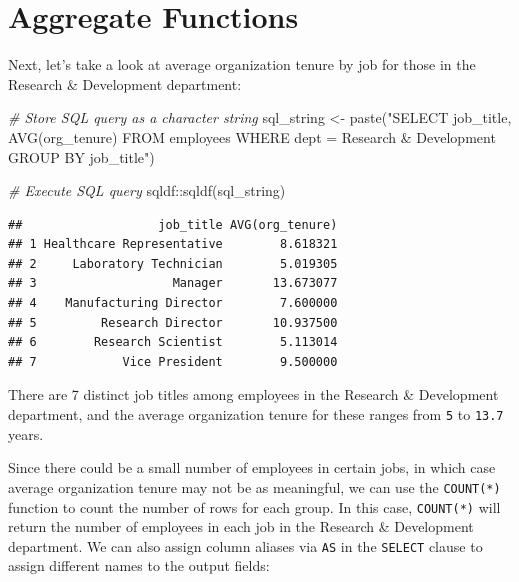 \documentclass[
]{book}
\newenvironment{Shaded}{\begin{snugshade}}{\end{snugshade}}
\newcommand{\CommentTok}[1]{\textcolor[rgb]{0.56,0.35,0.01}{\textit{#1}}}
\newcommand{\FunctionTok}[1]{\textcolor[rgb]{0.00,0.00,0.00}{#1}}
\newcommand{\NormalTok}[1]{#1}
\newcommand{\OtherTok}[1]{\textcolor[rgb]{0.56,0.35,0.01}{#1}}
\newcommand{\SpecialCharTok}[1]{\textcolor[rgb]{0.00,0.00,0.00}{#1}}
\newcommand{\StringTok}[1]{\textcolor[rgb]{0.31,0.60,0.02}{#1}}
\begin{document}
\hypertarget{aggregate-functions}{%
\section{Aggregate Functions}\label{aggregate-functions}}

Next, let's take a look at average organization tenure by job for those in the Research \& Development department:

\begin{Shaded}
\begin{Highlighting}[]
\CommentTok{\# Store SQL query as a character string}
\NormalTok{sql\_string }\OtherTok{\textless{}{-}} \FunctionTok{paste}\NormalTok{(}\StringTok{"SELECT}
\StringTok{                      job\_title,}
\StringTok{                      AVG(org\_tenure)}
\StringTok{                    FROM}
\StringTok{                      employees}
\StringTok{                    WHERE}
\StringTok{                      dept = \textquotesingle{}Research \& Development\textquotesingle{}}
\StringTok{                    GROUP BY}
\StringTok{                      job\_title"}\NormalTok{)}

\CommentTok{\# Execute SQL query}
\NormalTok{sqldf}\SpecialCharTok{::}\FunctionTok{sqldf}\NormalTok{(sql\_string)}
\end{Highlighting}
\end{Shaded}

\begin{verbatim}
##                   job_title AVG(org_tenure)
## 1 Healthcare Representative        8.618321
## 2     Laboratory Technician        5.019305
## 3                   Manager       13.673077
## 4    Manufacturing Director        7.600000
## 5         Research Director       10.937500
## 6        Research Scientist        5.113014
## 7            Vice President        9.500000
\end{verbatim}

There are 7 distinct job titles among employees in the Research \& Development department, and the average organization tenure for these ranges from \texttt{5} to \texttt{13.7} years.

Since there could be a small number of employees in certain jobs, in which case average organization tenure may not be as meaningful, we can use the \texttt{COUNT(*)} function to count the number of rows for each group. In this case, \texttt{COUNT(*)} will return the number of employees in each job in the Research \& Development department. We can also assign column aliases via \texttt{AS} in the \texttt{SELECT} clause to assign different names to the output fields:
\end{document}
